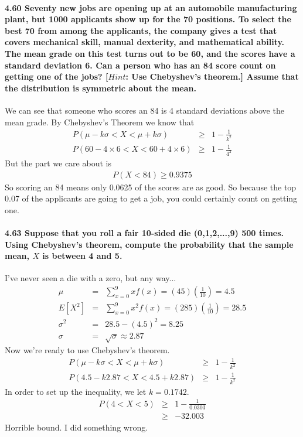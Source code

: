 \documentclass{article}
\begin{document}
\paragraph{4.60 Seventy new jobs are opening up at an automobile manufacturing 
plant, but 1000 applicants show up for the 70 positions. To select the best 70 
from among the applicants, the company gives a test that covers mechanical 
skill, manual dexterity, and mathematical ability. The mean grade on this test 
turns out to be 60, and the scores have a standard deviation 6. Can a person 
who has an 84 score count on getting one of the jobs? [$Hint$: Use Chebyshev's 
theorem.] Assume that the distribution is symmetric about the mean.\\}
We can see that someone who scores an 84 is 4 standard deviations above the 
mean grade. By Chebyshev's Theorem we know that
\begin{eqnarray*}
P(\mu-k\sigma<X<\mu+k\sigma) & \geq & 1-\frac{1}{k^2}\\
P(60-4\times6<X<60+4\times6) & \geq & 1-\frac{1}{4^2}
\end{eqnarray*}
But the part we care about is
\begin{eqnarray*}
P(X<84) \geq 0.9375
\end{eqnarray*}
So scoring an 84 means only 0.0625 of the scores are as good. So because the top
0.07 of the applicants are going to get a job, you could certainly count on 
getting one.


\paragraph{4.63 Suppose that you roll a fair 10-sided die (0,1,2,...,9) 500 
times. Using Chebyshev's theorem, compute the probability that the sample mean, 
$X$ is between 4 and 5.\\}
I've never seen a die with a zero, but any way...
\begin{eqnarray*}
\mu & = & \sum_{x=0}^9 xf(x) = (45)\left(\frac{1}{10}\right) = 4.5\\
E[X^2] & = & \sum_{x=0}^9 x^2f(x) = (285)\left(\frac{1}{10}\right) = 28.5\\
\sigma^2 & = & 28.5-(4.5)^2 = 8.25\\
\sigma & = & \sqrt{\sigma} \approx 2.87
\end{eqnarray*}
Now we're ready to use Chebyshev's theorem.
\begin{eqnarray*}
P(\mu-k\sigma<X<\mu+k\sigma) & \geq & 1-\frac{1}{k^2}\\
P(4.5-k2.87<X<4.5+k2.87) & \geq & 1-\frac{1}{k^2}
\end{eqnarray*}
In order to set up the inequality, we let $k=0.1742$.
\begin{eqnarray*}
P(4<X<5) & \geq & 1-\frac{1}{0.0303}\\
	& \geq & -32.003
\end{eqnarray*}
Horrible bound. I did something wrong.
\end{document}
